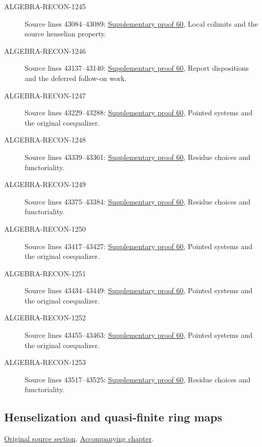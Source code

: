 \begin{description}
\item[ALGEBRA-RECON-1245] Source lines 43084--43089: \hyperlink{algebra_henselization_notes_20260929}{Supplementary proof 60}, Local colimits and the source henselian property.
\item[ALGEBRA-RECON-1246] Source lines 43137--43140: \hyperlink{algebra_henselization_notes_20260929}{Supplementary proof 60}, Report dispositions and the deferred follow-on work.
\item[ALGEBRA-RECON-1247] Source lines 43229--43288: \hyperlink{algebra_henselization_notes_20260929}{Supplementary proof 60}, Pointed systems and the original coequalizer.
\item[ALGEBRA-RECON-1248] Source lines 43339--43361: \hyperlink{algebra_henselization_notes_20260929}{Supplementary proof 60}, Residue choices and functoriality.
\item[ALGEBRA-RECON-1249] Source lines 43375--43384: \hyperlink{algebra_henselization_notes_20260929}{Supplementary proof 60}, Residue choices and functoriality.
\item[ALGEBRA-RECON-1250] Source lines 43417--43427: \hyperlink{algebra_henselization_notes_20260929}{Supplementary proof 60}, Pointed systems and the original coequalizer.
\item[ALGEBRA-RECON-1251] Source lines 43434--43449: \hyperlink{algebra_henselization_notes_20260929}{Supplementary proof 60}, Pointed systems and the original coequalizer.
\item[ALGEBRA-RECON-1252] Source lines 43455--43463: \hyperlink{algebra_henselization_notes_20260929}{Supplementary proof 60}, Pointed systems and the original coequalizer.
\item[ALGEBRA-RECON-1253] Source lines 43517--43525: \hyperlink{algebra_henselization_notes_20260929}{Supplementary proof 60}, Residue choices and functoriality.
\end{description}

\subsection{Henselization and quasi-finite ring maps}
\hypertarget{algebra-source-section-henselization-quasi-finite}{}
\noindent\href{https://github.com/stacks/stacks-project/blob/a04446e57ec1fbc252a871afcec7752fb2807b14/algebra.tex\#L43573}{Original source section}. \href{algebra.pdf\#nameddest=section-henselization-quasi-finite}{Accompanying chapter}.

